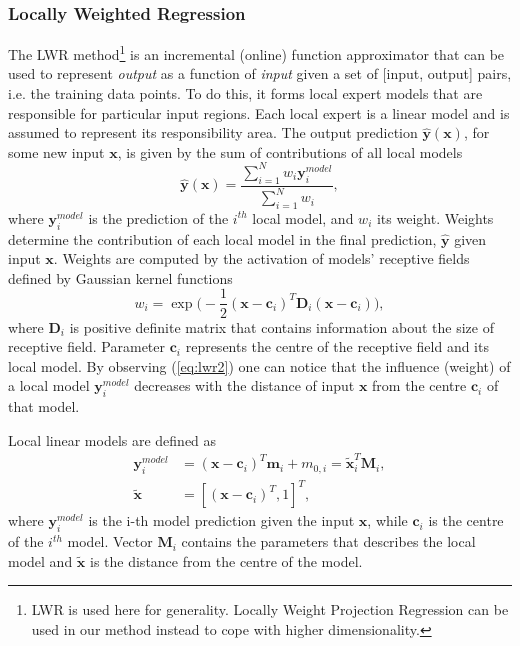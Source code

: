 \subsubsection{Locally Weighted Regression}
The LWR method\footnote{LWR is used here for generality. Locally Weight Projection Regression\cite{Vijayakumar2005} can be used in our method instead to cope with higher dimensionality.} is an incremental (online) function approximator that can be used to represent {\it output} as a function of {\it input} given a set of [input, output] pairs, i.e. the training data points. To do this, it forms local expert models that are responsible for particular input regions. Each local expert is a linear model and is assumed to represent its responsibility area. The output prediction $\hat{\bm{y}}(\bm{x})$, for some new input $\bm{x}$, is given by the sum of contributions of all local models \cite{Schaal1998}
\begin{equation}
\hat{\bm{y}}(\bm{x}) = \frac{\sum\limits_{i=1}^N w_{i}\bm{y}_{i}^{model}}{\sum\limits_{i=1}^N w_{i}},
\label{eq:lwr1}
\end{equation}
where $\bm{y}_{i}^{model}$ is the prediction of the $i^{th}$ local model, and $w_{i}$ its weight. Weights determine the contribution of each local model in the final prediction, $\hat{\bm{y}}$ given input $\bm{x}$. Weights are computed by the activation of models' receptive fields defined by Gaussian kernel functions \cite{Schaal1998}
\begin{equation}
w_{i} = \exp\big(-\frac{1}{2}(\bm{x}-\bm{c}_{i})^{T}\bm{D}_{i}(\bm{x}-\bm{c}_{i})\big),
\label{eq:lwr2}
\end{equation}
where $\bm{D}_{i}$ is positive definite matrix that contains information about the size of receptive field. Parameter $\bm{c}_{i}$ represents the centre of the receptive field and its local model. By observing (\ref{eq:lwr2}) one can notice that the influence (weight) of a local model $\bm{y}_{i}^{model}$ decreases with the distance of input $\bm{x}$ from the centre $\bm{c}_{i}$ of that model.

Local linear models are defined as \cite{Schaal1998}
\begin{align}
	\bm{y}_{i}^{model} &= (\bm{x} - \bm{c}_i)^{T} \bm{m}_i + m_{0,i} = \tilde{\bm{x}}_{i}^{T}\bm{M}_{i},\label{eq:lwr3}\\
	\tilde{\bm{x}} &= [(\bm{x}-\bm{c}_{i})^{T},1]^{T},\label{eq:lwr4}
\end{align}
where $\bm{y}_{i}^{model}$ is the i-th model prediction given the input $\bm{x}$, while $\bm{c}_{i}$ is the centre of the $i^{th}$ model. Vector $\bm{M}_{i}$ contains the parameters that describes the local model and $\tilde{\bm{x}}$ is the distance from the centre of the model.

